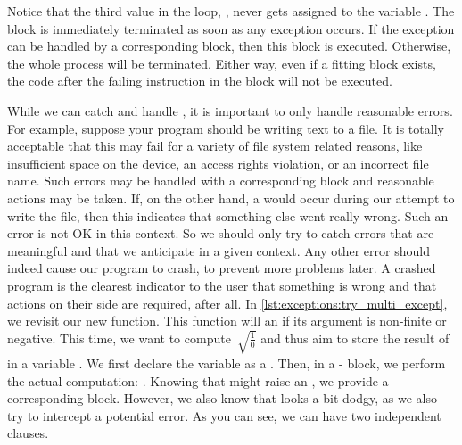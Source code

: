 Notice that the third value in the loop, , never gets assigned to the variable .
The  block is immediately terminated as soon as any exception occurs.
If the exception can be handled by a corresponding  block, then this block is executed.
Otherwise, the whole process will be terminated.
Either way, even if a fitting  block exists, the code after the failing instruction in the  block will not be executed.

While we can catch and handle , it is important to only handle reasonable errors.
For example, suppose your program should be writing text to a file.
It is totally acceptable that this may fail for a variety of file system related reasons, like insufficient space on the device, an access rights violation, or an incorrect file name.
Such errors may be handled with a corresponding  block and reasonable actions may be taken.
If, on the other hand, a  would occur during our attempt to write the file, then this indicates that something else went really wrong.
Such an error is not OK in this context.
So we should only try to catch errors that are meaningful and that we anticipate in a given context.
Any other error should indeed cause our program to crash, to prevent more problems later.
A crashed program is the clearest indicator to the user that something is wrong and that actions on their side are required, after all.%
%
%
%
%
%
In \cref{lst:exceptions:try_multi_except}, we revisit our new  function.
This function will  an  if its argument is non-finite or negative.
This time, we want to compute~$\sqrt{\frac{1}{0}}$ and thus aim to store the result of  in a variable .
We first declare the variable as a .
Then, in a - block, we perform the actual computation: .
Knowing that  might raise an , we provide a corresponding  block.
However, we also know that  looks a bit dodgy, as we also try to intercept a potential  error.
As you can see, we can have two independent  clauses.

